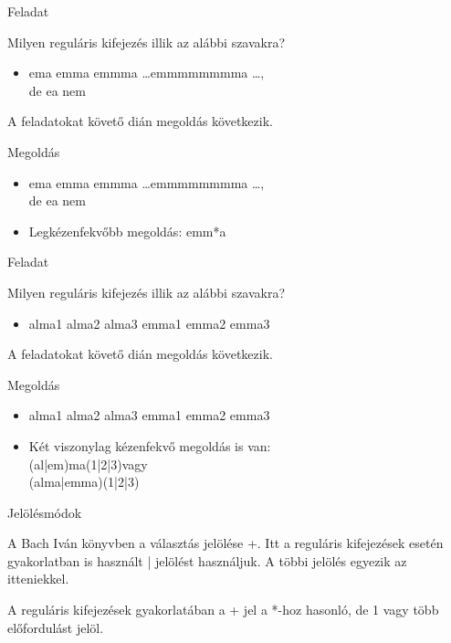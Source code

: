 \documentclass[
    ignorenonframetext
    ]{beamer}
\begin{document}
\begin{frame}
    {Feladat}

    Milyen reguláris kifejezés illik az alábbi szavakra?

    \begin{itemize}
        \item ema emma emmma \ldots emmmmmmmma \ldots,\\
            de ea nem
    \end{itemize}

    A feladatokat követő dián megoldás következik.
\end{frame}

\begin{frame}
    {Megoldás}

    \begin{itemize}
        \item ema emma emmma \ldots emmmmmmmma \ldots,\\
            de ea nem\\
	\item Legkézenfekvőbb megoldás: emm*a
    \end{itemize}
\end{frame}

\begin{frame}
    {Feladat}

    Milyen reguláris kifejezés illik az alábbi szavakra?

    \begin{itemize}
        \item alma1 alma2 alma3 emma1 emma2 emma3
    \end{itemize}

    A feladatokat követő dián megoldás következik.
\end{frame}

\begin{frame}
    {Megoldás}

    \begin{itemize}
        \item alma1 alma2 alma3 emma1 emma2 emma3\\
	\item Két viszonylag kézenfekvő megoldás is van:\\
            (al|em)ma(1|2|3)\qquad   vagy\\
            (alma|emma)(1|2|3)
    \end{itemize}
\end{frame}

\begin{frame}
    {Jelölésmódok}

    A Bach Iván könyvben a választás jelölése +. Itt a
    reguláris kifejezések esetén  gyakorlatban is használt | jelölést
    használjuk. A többi jelölés egyezik az itteniekkel.

    A reguláris kifejezések gyakorlatában a + jel a *-hoz hasonló, de 1
    vagy több előfordulást jelöl.
\end{frame}
\end{document}
